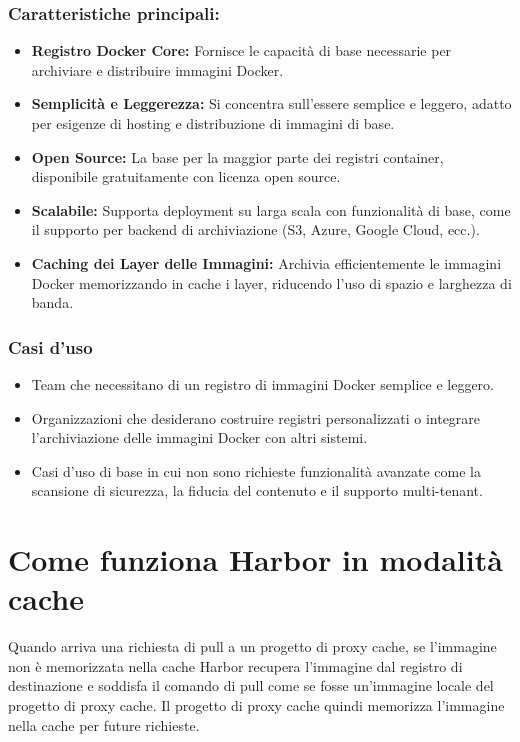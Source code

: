 \documentclass[12pt]{report}
\begin{document}
\subsubsection{Caratteristiche principali:}
\begin{itemize}
  \item \textbf{Registro Docker Core:} Fornisce le capacità di base necessarie per archiviare e distribuire immagini Docker.
  \item \textbf{Semplicità e Leggerezza:} Si concentra sull'essere semplice e leggero, adatto per esigenze di hosting e distribuzione di immagini di base.
  \item \textbf{Open Source:} La base per la maggior parte dei registri container, disponibile gratuitamente con licenza open source.
  \item \textbf{Scalabile:} Supporta deployment su larga scala con funzionalità di base, come il supporto per backend di archiviazione (S3, Azure, Google Cloud, ecc.).
  \item \textbf{Caching dei Layer delle Immagini:} Archivia efficientemente le immagini Docker memorizzando in cache i layer, riducendo l'uso di spazio e larghezza di banda.
\end{itemize}

\subsubsection{Casi d'uso}
\begin{itemize}
  \item Team che necessitano di un registro di immagini Docker semplice e leggero.
  \item Organizzazioni che desiderano costruire registri personalizzati o integrare l'archiviazione delle immagini Docker con altri sistemi.
  \item Casi d'uso di base in cui non sono richieste funzionalità avanzate come la scansione di sicurezza, la fiducia del contenuto e il supporto multi-tenant.
\end{itemize}

\section{Come funziona Harbor in modalità cache}
Quando arriva una richiesta di pull a un progetto di proxy cache, se l'immagine non è memorizzata nella cache Harbor recupera l'immagine dal registro di destinazione e soddisfa il comando di pull come se fosse un'immagine locale del progetto di proxy cache. Il progetto di proxy cache quindi memorizza l'immagine nella cache per future richieste.
\end{document}
